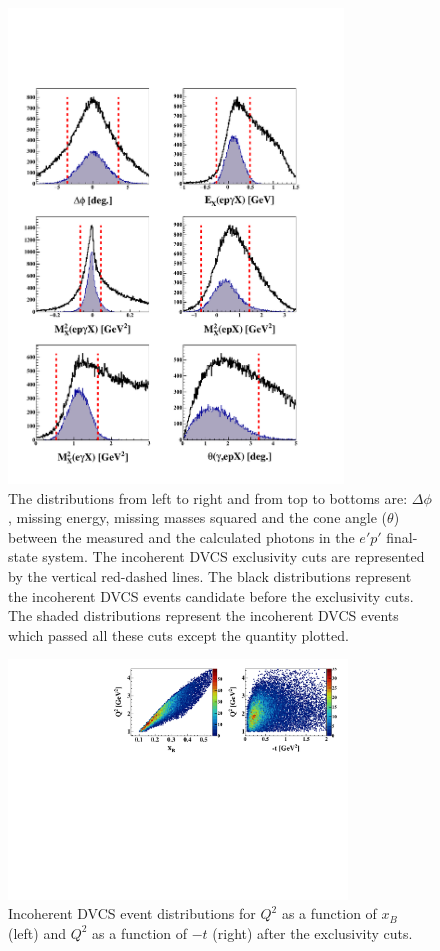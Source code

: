 \documentclass[twocolumn,nofootinbib,showpacs,prl,superscriptaddress,secnumarabic,amssymb,nobibnotes,aps,floatfix]{revtex4}
\begin{document}
\begin{figure}[tb]
\includegraphics[width=8.9cm]{figs/incoh_exc_cuts_final.pdf}
\caption{The distributions 
   from left to right and from top to bottoms are: $\Delta \phi$, missing 
   energy, missing masses squared and the cone angle ($\theta$) between the 
   measured and the calculated photons in the $e'p'$ final-state system.
   The incoherent DVCS exclusivity cuts are represented by the vertical 
   red-dashed lines. The black distributions 
   represent the incoherent DVCS events candidate before the exclusivity 
   cuts. The shaded distributions represent the incoherent DVCS events which 
   passed all these cuts except the quantity plotted.}
\label{fig:kin-cuts}

\end{figure}
\begin{figure}[h!]
\hspace{-0.45cm}
\includegraphics[width=9.0cm]{figs/Q2_xB_t_InCoh.pdf}
\caption{Incoherent DVCS event distributions for $Q^{2}$ as a function of 
$x_{B}$ (left) and $Q^{2}$ as a function of $-t$ (right) after the exclusivity 
cuts.}
\label{fig:kin-coverage}
\end{figure}
\end{document}
